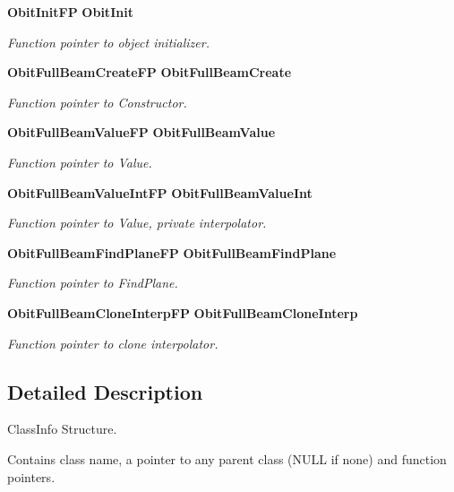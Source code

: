 \begin{CompactItemize}
{\bf Obit\-Init\-FP} {\bf Obit\-Init}
\begin{CompactList}\small\item\em Function pointer to object initializer. \item\end{CompactList}\item 
{\bf Obit\-Full\-Beam\-Create\-FP} {\bf Obit\-Full\-Beam\-Create}
\begin{CompactList}\small\item\em Function pointer to Constructor. \item\end{CompactList}\item 
{\bf Obit\-Full\-Beam\-Value\-FP} {\bf Obit\-Full\-Beam\-Value}
\begin{CompactList}\small\item\em Function pointer to Value. \item\end{CompactList}\item 
{\bf Obit\-Full\-Beam\-Value\-Int\-FP} {\bf Obit\-Full\-Beam\-Value\-Int}
\begin{CompactList}\small\item\em Function pointer to Value, private interpolator. \item\end{CompactList}\item 
{\bf Obit\-Full\-Beam\-Find\-Plane\-FP} {\bf Obit\-Full\-Beam\-Find\-Plane}
\begin{CompactList}\small\item\em Function pointer to Find\-Plane. \item\end{CompactList}\item 
{\bf Obit\-Full\-Beam\-Clone\-Interp\-FP} {\bf Obit\-Full\-Beam\-Clone\-Interp}
\begin{CompactList}\small\item\em Function pointer to clone interpolator. \item\end{CompactList}\end{CompactItemize}


\subsection{Detailed Description}
Class\-Info Structure. 

Contains class name, a pointer to any parent class (NULL if none) and function pointers. 



